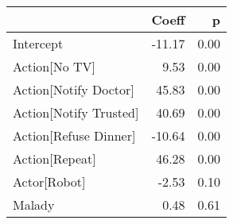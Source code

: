 \begin{tabular}{lrr}
\toprule
{} &  Coeff &    p \\
\midrule
Intercept                & -11.17 & 0.00 \\
Action[No TV]          &   9.53 & 0.00 \\
Action[Notify Doctor]  &  45.83 & 0.00 \\
Action[Notify Trusted] &  40.69 & 0.00 \\
Action[Refuse Dinner]  & -10.64 & 0.00 \\
Action[Repeat]         &  46.28 & 0.00 \\
Actor[Robot]           &  -2.53 & 0.10 \\
Malady                   &   0.48 & 0.61 \\
\bottomrule
\end{tabular}
